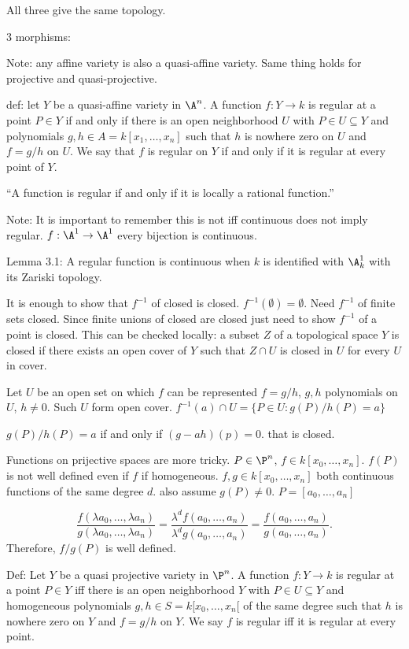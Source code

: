 All three give the same topology. 

3 morphisms:

Note: any affine variety is also a quasi-affine variety. Same thing holds for projective and quasi-projective.

def: let $Y$ be a quasi-affine variety in $\A^n$. A function $f: Y \to k$ is regular at a point $P \in Y$ if and only if there is an open neighborhood $U$ with $P \in U \subseteq Y$ and polynomials $g,h \in A= k[x_1,\ldots,x_n]$ such that $h$ is nowhere zero on $U$ and $f= g/h$ on $U$. We say that $f$ is regular on $Y$ if and only if it is regular at every point of $Y$.

``A function is regular if and only if it is locally a rational function.''

Note: It is important to remember this is not iff continuous does not imply regular. $f: \A^1 \to \A^1$ every bijection is continuous. 

Lemma 3.1: A regular function is continuous when $k$ is identified with $\A^1_k$ with its Zariski topology. 

\pf It is enough to show that $f^{-1}$ of closed is closed. $f^{-1}(\emptyset)= \emptyset$. Need $f^{-1}$ of finite sets closed. Since finite unions of closed are closed just need to show $f^{-1}$ of a point is closed. This can be checked locally: a subset $Z$ of a topological space $Y$ is closed if there exists an open cover of $Y$ such that $Z \cap U$ is closed in $U$ for every $U$ in cover. 

Let $U$ be an open set on which $f$ can be represented $f= g/h$, $g,h$ polynomials on $U$, $h \neq 0$. Such $U$ form open cover. $f^{-1}(a) \cap U= \{ P \in U \colon g(P)/h(P)= a \}$

$g(P)/h(P)=a$ if and only if $(g-ah)(p)=0$. that is closed. 


Functions on prijective spaces are more tricky. $P \in \P^n$, $f \in k[x_0,\ldots,x_n]$. $f(P)$ is not well defined even if $f$ if homogeneous. $f,g \in k[x_0,\ldots,x_n]$ both continuous functions of the same degree $d$. also assume $g(P) \neq 0$. $P= [a_0,\ldots,a_n]$

	\[
	\dfrac{f(\lambda a_0,\ldots,\lambda a_n)}{g(\lambda a_0,\ldots,\lambda a_n)}= \dfrac{\lambda^d f(a_0,\ldots,a_n)}{\lambda^d g(a_0,\ldots,a_n)}= \dfrac{f(a_0,\ldots,a_n)}{g(a_0,\ldots,a_n)}.
	\]
Therefore, $f/g(P)$ is well defined. 


Def: Let $Y$ be a quasi projective variety in $\P^n$. A function $f: Y \to k$ is regular at a point $P \in Y$ iff there is an open neighborhood $Y$ with $P \in U \subseteq Y$ and homogeneous polynomials $g,h \in S= k[x_0,\ldots,x_n[$ of the same degree such that $h$ is nowhere zero on  $Y$ and $f=g/h$ on $Y$. We say $f$ is regular iff it is regular at every point. 


